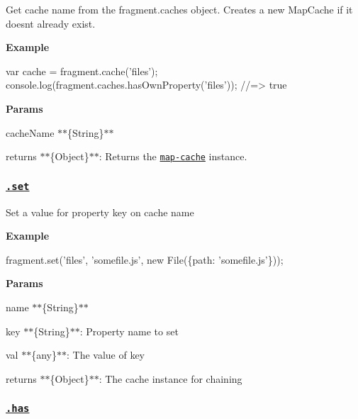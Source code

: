 Get cache {\ttfamily name} from the {\ttfamily fragment.\+caches} object. Creates a new {\ttfamily Map\+Cache} if it doesn\textquotesingle{}t already exist.

{\bfseries Example}


\begin{DoxyCode}
var cache = fragment.cache('files');
console.log(fragment.caches.hasOwnProperty('files'));
//=> true
\end{DoxyCode}


{\bfseries Params}


\begin{DoxyItemize}
\item {\ttfamily cache\+Name} $\ast$$\ast$\{String\}$\ast$$\ast$
\item {\ttfamily returns} $\ast$$\ast$\{Object\}$\ast$$\ast$\+: Returns the \href{https://github.com/jonschlinkert/map-cache}{\tt map-\/cache} instance.
\end{DoxyItemize}

\subsubsection*{\href{index.js#L67}{\tt .set}}

Set a value for property {\ttfamily key} on cache {\ttfamily name}

{\bfseries Example}


\begin{DoxyCode}
fragment.set('files', 'somefile.js', new File(\{path: 'somefile.js'\}));
\end{DoxyCode}


{\bfseries Params}


\begin{DoxyItemize}
\item {\ttfamily name} $\ast$$\ast$\{String\}$\ast$$\ast$
\item {\ttfamily key} $\ast$$\ast$\{String\}$\ast$$\ast$\+: Property name to set
\item {\ttfamily val} $\ast$$\ast$\{any\}$\ast$$\ast$\+: The value of {\ttfamily key}
\item {\ttfamily returns} $\ast$$\ast$\{Object\}$\ast$$\ast$\+: The cache instance for chaining
\end{DoxyItemize}

\subsubsection*{\href{index.js#L93}{\tt .has}}

